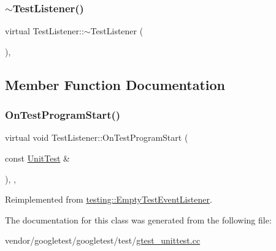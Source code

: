 \mbox{\label{class_test_listener_ae59dec3ae673618185eebf71881902e9}} 
\subsubsection{\texorpdfstring{$\sim$\+Test\+Listener()}{~TestListener()}}
{\footnotesize\ttfamily virtual Test\+Listener\+::$\sim$\+Test\+Listener (\begin{DoxyParamCaption}{ }\end{DoxyParamCaption})\hspace{0.3cm}{\ttfamily [inline]}, {\ttfamily [virtual]}}



\subsection{Member Function Documentation}
\mbox{\label{class_test_listener_a6218f522f5b6b37050ff0ea630ac5fd3}} 
\subsubsection{\texorpdfstring{On\+Test\+Program\+Start()}{OnTestProgramStart()}}
{\footnotesize\ttfamily virtual void Test\+Listener\+::\+On\+Test\+Program\+Start (\begin{DoxyParamCaption}\item[{const \hyperlink{classtesting_1_1_unit_test}{Unit\+Test} \&}]{ }\end{DoxyParamCaption})\hspace{0.3cm}{\ttfamily [inline]}, {\ttfamily [protected]}, {\ttfamily [virtual]}}



Reimplemented from \hyperlink{classtesting_1_1_empty_test_event_listener_aa3847c8a3c22d8d69a6006dfdd6589fc}{testing\+::\+Empty\+Test\+Event\+Listener}.



The documentation for this class was generated from the following file\+:\begin{DoxyCompactItemize}
\item 
vendor/googletest/googletest/test/\hyperlink{gtest__unittest_8cc}{gtest\+\_\+unittest.\+cc}\end{DoxyCompactItemize}
